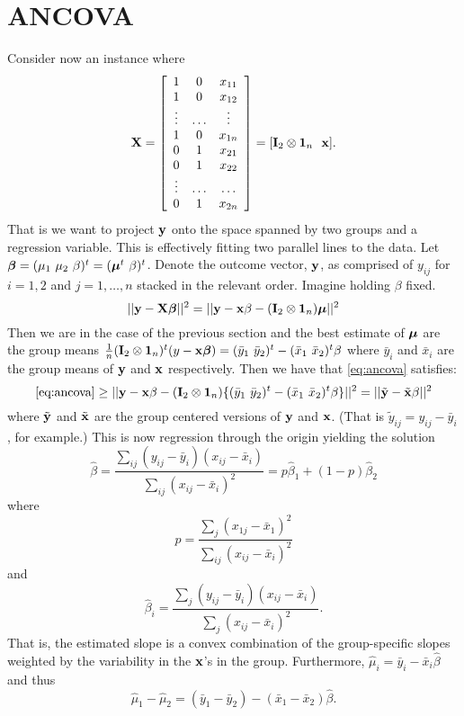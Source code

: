 \section{ANCOVA}

Consider now an instance where
$$
\mathbf{X} =
\left[
\begin{array}{ccc}
1 & 0  & x_{11} \\
1 & 0  & x_{12} \\
\vdots &  \ldots  & \vdots \\
1  & 0 & x_{1n}  \\
0  & 1 & x_{21} \\
0  & 1 & x_{22} \\
\vdots & \ldots & \ldots \\
0  & 1 & x_{2n}
\end{array}
\right]
= [\mathbf{I}_{2} \otimes \mathbf{1}_n ~~ \mathbf{x}]
.
$$
That is we want to project $\mathbf{y}$ onto the space spanned by two groups
and a regression variable. This is effectively fitting two parallel
lines to the data.
Let $\boldsymbol{\beta} = (\mu_1 ~ \mu_2 ~ \beta)^t = (\boldsymbol{\mu}^t ~ \beta)^t$. Denote the outcome
vector, $\mathbf{y}$, as comprised of $y_{ij}$ for $i=1,2$ and $j=1,\ldots,n$
stacked in the relevant order. Imagine holding $\beta$ fixed. 
\begin{equation}
\label{eq:ancova}
|| \mathbf{y} - \mathbf{X} \boldsymbol{\beta} ||^2 = 
|| \mathbf{y} - \mathbf{x} \beta - (\mathbf{I}_2 \otimes \mathbf{1}_n) \boldsymbol{\mu} ||^2
\end{equation}
Then we
are in the case of the previous section and the best estimate
of $\boldsymbol{\mu}$ are the group means $\frac{1}{n}(\mathbf{I}_2 \otimes \mathbf{1}_n)^t(y - \mathbf{x} \boldsymbol{\beta}) = (\bar y_1 ~ \bar y_2)^t - (\bar x_1 ~ \bar x_2)^t \beta$ where
$\bar y_i$ and $\bar x_i$ are the group means of $\mathbf{y}$ and $\mathbf{x}$ respectively.
Then we have that \eqref{eq:ancova} satisfies:
$$
\eqref{eq:ancova} \geq 
|| \mathbf{y} - \mathbf{x} \beta - (\mathbf{I}_2 \otimes \mathbf{1}_n) \{(\bar y_1 ~ \bar y_2)^t - (\bar x_1 ~ \bar x_2)^t \beta\}||^2
= || \tilde {\mathbf{y}} - \tilde {\mathbf{x}} \beta||^2
$$
where $\tilde {\mathbf{y}}$ and $\tilde {\mathbf{x}}$ are the group centered versions 
of $\mathbf{y}$ and $\mathbf{x}$. (That is $\tilde y_{ij} = y_{ij} - \bar y_i$, for example.)
This is now regression through the origin yielding the solution
$$
\hat \beta 
= \frac{\sum_{ij} (y_{ij} - \bar y_i) (x_{ij} - \bar x_i)}
{\sum_{ij} (x_{ij} - \bar x_i)^2}
= p \hat \beta_1 + (1 - p) \hat \beta_2
$$
where 
$$
p = \frac{\sum_{j} (x_{1j} - \bar x_1)^2}{\sum_{ij} (x_{ij} - \bar x_i)^2}
$$
and 
$$
\hat \beta_i =
\frac{\sum_{j} (y_{ij} - \bar y_i) (x_{ij} - \bar x_i)}
{\sum_{j} (x_{ij} - \bar x_i)^2}.
$$
That is, the estimated slope is a convex combination of the
group-specific slopes weighted by the variability in the $\mathbf{x}$'s
in the group. Furthermore,
$\hat \mu_i = \bar y_i - \bar x_i \hat \beta$ and thus
$$
\hat \mu_1 - \hat \mu_2
= (\bar y_1 - \bar y_2) - (\bar x_1 - \bar x_2) \hat \beta.
$$
